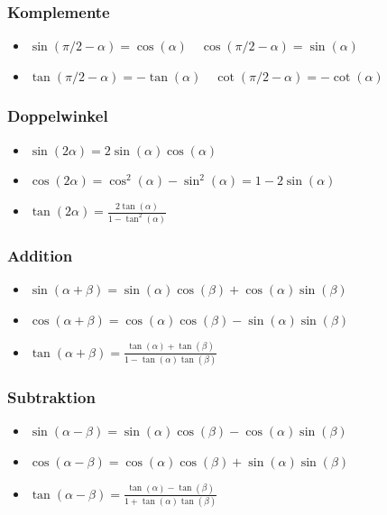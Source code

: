 \documentclass[a4paper,8pt]{extarticle}
\begin{document}
\subsubsection{Komplemente}
\begin{itemize}
 \item $\sin(\pi/2 - \alpha) = \cos(\alpha) \quad \cos(\pi/2 - \alpha) = \sin(\alpha)$
 \item $\tan(\pi/2 - \alpha) = -\tan(\alpha) \quad \cot(\pi/2 - \alpha) = -\cot(\alpha)$
\end{itemize}

\subsubsection{Doppelwinkel}
\begin{itemize}
 \item $\sin(2\alpha) = 2 \sin(\alpha) \cos(\alpha)$
 \item $\cos(2\alpha) = \cos^2(\alpha) - \sin^2(\alpha) = 1 - 2 \sin(\alpha)$
 \item $\tan(2\alpha) = \frac{2\tan(\alpha)}{1 - \tan^2(\alpha)}$
\end{itemize}

\subsubsection{Addition}
\begin{itemize}
 \item $\sin(\alpha + \beta) = \sin(\alpha) \cos(\beta) + \cos(\alpha) \sin(\beta)$
 \item $\cos(\alpha + \beta) = \cos(\alpha) \cos(\beta) - \sin(\alpha) \sin(\beta)$
 \item $\tan(\alpha + \beta) = \frac{\tan(\alpha) + \tan(\beta)}{1 - \tan(\alpha) \tan(\beta)}$
\end{itemize}

\subsubsection{Subtraktion}
\begin{itemize}
 \item $\sin(\alpha - \beta) = \sin(\alpha) \cos(\beta) - \cos(\alpha)\sin(\beta)$
 \item $\cos(\alpha - \beta) = \cos(\alpha) \cos(\beta) + \sin(\alpha)\sin(\beta)$
 \item $\tan(\alpha - \beta) = \frac{\tan(\alpha) - \tan(\beta)}{1+\tan(\alpha) \tan(\beta)}$
\end{itemize}
\end{document}
